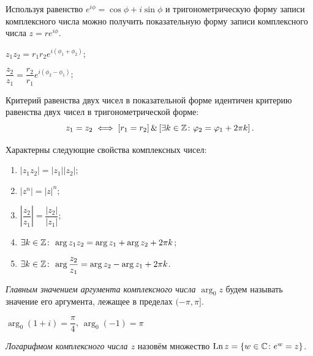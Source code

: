
Используя равенство \(e^{i\phi} = \cos{\phi} + i\sin{\phi}\) и тригонометрическую форму записи
комплексного числа можно получить показательную форму записи комплексного числа \(z =
re^{i\phi}\).
\begin{properties}
\item \(z_1z_2 = r_1r_2e^{i(\phi_1 + \phi_2)}\);
\item \(\dfrac{z_2}{z_1} = \dfrac{r_2}{r_1}e^{i(\phi_2 - \phi_1)}\);
\item \label{3:kriterion_equality}Критерий равенства двух чисел в показательной форме идентичен
критерию равенства двух чисел в тригонометрической форме:
\[
    z_1 = z_2 \iff \left[r_1 = r_2\right] \& \left[\exists k \in \mathbb{Z} \colon \varphi_2 = \varphi_1 + 2\pi
        k\right].
\]
\end{properties}

\begin{corollary}
Характерны следующие свойства комплексных чисел:
\begin{enumerate}
\item \(|z_1 z_2| = |z_1||z_2|\);
\item \(|z^n| = |z|^n\);
\item \(\left|\dfrac{z_2}{z_1}\right| = \dfrac{|z_2|}{|z_1|}\);
\item \(\exists k \in \mathbb{Z} \colon \, \arg{z_1 z_2} = \arg{z_1} + \arg{z_2} + 2\pi k\);
\item \(\exists k \in \mathbb{Z} \colon \, \arg{\dfrac{z_2}{z_1}} = \arg{z_2} - \arg{z_1} + 2\pi k\).
\end{enumerate}
\end{corollary}

\begin{definition}
\textit{Главным значением аргумента комплексного числа \(\arg_0{z}\)} будем называть значение его
аргумента, лежащее в пределах \((-\pi, \pi]\).
\end{definition}
\begin{example}
\(\arg_0{(1+i)} = \dfrac{\pi}{4}\), \(\arg_0{(-1)} = \pi\)
\end{example}


\begin{definition}
\textit{Логарифмом комплексного числа \(z\)} назовём множество \(\operatorname{Ln}{z} = \{w \in \mathbb{C} \colon e^w =
z\}\).
\end{definition}

